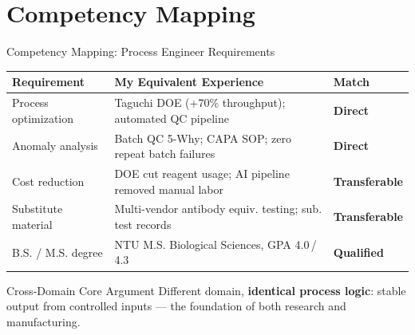 \documentclass[aspectratio=169,10pt]{beamer}
\begin{document}
\section{Competency Mapping}
\begin{frame}{Competency Mapping: Process Engineer Requirements}
  \begin{center}
  \footnotesize
  \begin{tabular}{p{2.5cm}p{5.5cm}p{2.2cm}}
    \toprule
    \textbf{Requirement} & \textbf{My Equivalent Experience} & \textbf{Match} \\
    \midrule
    Process optimization &
    Taguchi DOE (+70\% throughput); automated QC pipeline &
    \textcolor{successgreen}{\textbf{Direct}} \\[2pt]
    Anomaly analysis &
    Batch QC 5-Why; CAPA SOP; zero repeat batch failures &
    \textcolor{successgreen}{\textbf{Direct}} \\[2pt]
    Cost reduction &
    DOE cut reagent usage; AI pipeline removed manual labor &
    \textcolor{successgreen}{\textbf{Transferable}} \\[2pt]
    Substitute material &
    Multi-vendor antibody equiv. testing; sub. test records &
    \textcolor{successgreen}{\textbf{Transferable}} \\[2pt]
    B.S. / M.S. degree &
    NTU M.S. Biological Sciences, GPA 4.0\,/\,4.3 &
    \textcolor{successgreen}{\textbf{Qualified}} \\
    \bottomrule
  \end{tabular}
  \end{center}

  \vspace{0.08cm}
  \begin{alertblock}{Cross-Domain Core Argument}
    \small
    Different domain, \textbf{identical process logic}:
    stable output from controlled inputs --- the foundation of both research and manufacturing.
  \end{alertblock}
\end{frame}
\end{document}
